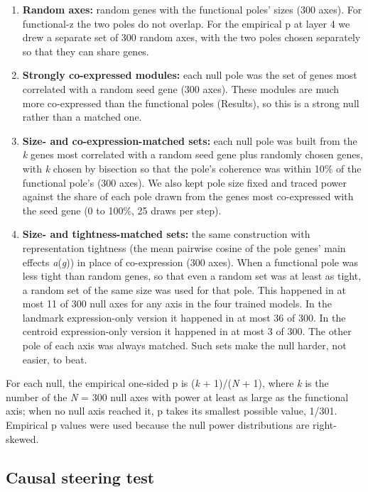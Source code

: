 \documentclass[
  11pt,
]{article}
\providecommand{\tightlist}{%
  \setlength{\itemsep}{0pt}\setlength{\parskip}{0pt}}
\begin{document}
\begin{enumerate}
\def\labelenumi{\arabic{enumi}.}
\tightlist
\item
  \textbf{Random axes:} random genes with the functional poles' sizes
  (300 axes). For functional-z the two poles do not overlap. For the
  empirical p at layer 4 we drew a separate set of 300 random axes, with
  the two poles chosen separately so that they can share genes.
\item
  \textbf{Strongly co-expressed modules:} each null pole was the set of
  genes most correlated with a random seed gene (300 axes). These
  modules are much more co-expressed than the functional poles
  (Results), so this is a strong null rather than a matched one.
\item
  \textbf{Size- and co-expression-matched sets:} each null pole was
  built from the \emph{k} genes most correlated with a random seed gene
  plus randomly chosen genes, with \emph{k} chosen by bisection so that
  the pole's coherence was within 10\% of the functional pole's (300
  axes). We also kept pole size fixed and traced power against the share
  of each pole drawn from the genes most co-expressed with the seed gene
  (0 to 100\%, 25 draws per step).
\item
  \textbf{Size- and tightness-matched sets:} the same construction with
  representation tightness (the mean pairwise cosine of the pole genes'
  main effects \emph{a}(\emph{g})) in place of co-expression (300 axes).
  When a functional pole was less tight than random genes, so that even
  a random set was at least as tight, a random set of the same size was
  used for that pole. This happened in at most 11 of 300 null axes for
  any axis in the four trained models. In the landmark expression-only
  version it happened in at most 36 of 300. In the centroid
  expression-only version it happened in at most 3 of 300. The other
  pole of each axis was always matched. Such sets make the null harder,
  not easier, to beat.
\end{enumerate}

For each null, the empirical one-sided p is (\emph{k} + 1)/(\emph{N} +
1), where \emph{k} is the number of the \emph{N} = 300 null axes with
power at least as large as the functional axis; when no null axis
reached it, p takes its smallest possible value, 1/301. Empirical p
values were used because the null power distributions are right-skewed.

\subsection{Causal steering test}\label{causal-steering-test}
\end{document}
